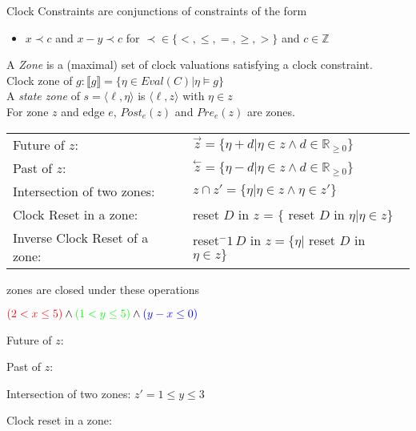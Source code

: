 \documentclass[a4paper, 10pt]{article}
\begin{document}
\begin{mdframed}
\begin{itemize}
\end{itemize}
Clock Constraints are conjunctions of constraints of the form
\begin{itemize}
    \item $x\prec c$ and $x-y\prec c$ for $\prec\in\{<,\leq,=,\geq,>\}$ and $c\in\mathds{Z}$
\end{itemize}
A \emph{Zone} is a (maximal) set of clock valuations satisfying a clock constraint. \\
Clock zone of $g:\llbracket g\rrbracket=\{\eta\in Eval(C)|\eta\models g\}$ \\
A \emph{state zone} of $s=\langle\ell,\eta\rangle$ is $\langle\ell,z\rangle$ with $\eta\in z$ \\
For zone $z$ and edge $e$, $Post_e(z)$ and $Pre_e(z)$ are zones. \\
\begin{tabular}{ll}
Future of $z$: & $\overset{\rightarrow}{z} = \{\eta+d | \eta\in z\wedge d\in\mathds{R}_{\geq0}\}$ \\
Past of $z$: & $\overset{\leftarrow}{z} = \{\eta-d | \eta\in z\wedge d\in\mathds{R}_{\geq0}\}$ \\
Intersection of two zones: & $z\cap z' = \{\eta|\eta\in z \wedge\eta\in z'\}$ \\
Clock Reset in a zone: & reset $D$ in $z$ = $\{$ reset $D$ in $\eta | \eta\in z\}$ \\
Inverse Clock Reset of a zone: & reset$^-1\,D$ in $z=\{\eta|$ reset $D$ in $\eta\in z\}$
\end{tabular}
zones are closed under these operations
\begin{multicols}{2}
$\textcolor{red}{(2<x\leq5)}\wedge\textcolor{green}{(1<y\leq5)}\wedge\textcolor{blue}{(y-x\leq0)}$
\begin{center}
\scalebox{.7}{}
\end{center}
Future of $z$:
\begin{center}
\scalebox{.7}{}
\end{center}
Past of $z$:
\begin{center}
\scalebox{.7}{}
\end{center}
Intersection of two zones: {\tiny $z'=1\leq y\leq3$}
\begin{center}
\scalebox{.7}{}
\end{center}
Clock reset in a zone:
\begin{center}

\end{center}
\end{multicols}
\end{mdframed}
\end{document}

